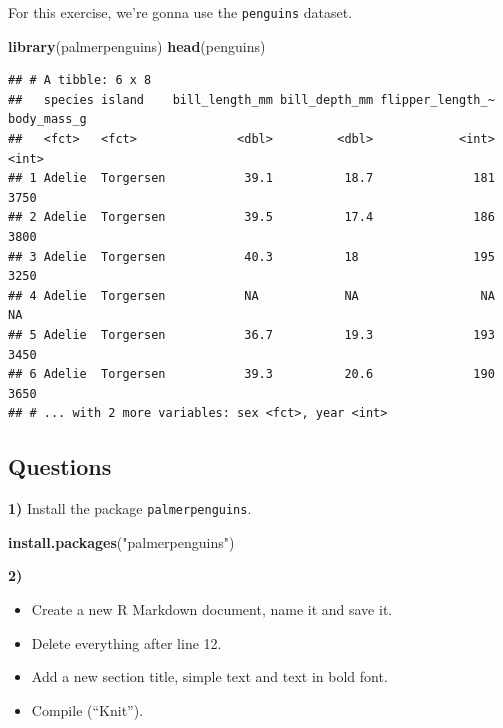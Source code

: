 \documentclass[
  12pt,
]{book}
\newenvironment{Shaded}{\begin{snugshade}}{\end{snugshade}}
\newcommand{\KeywordTok}[1]{\textcolor[rgb]{0.13,0.29,0.53}{\textbf{#1}}}
\newcommand{\NormalTok}[1]{#1}
\newcommand{\StringTok}[1]{\textcolor[rgb]{0.31,0.60,0.02}{#1}}
\providecommand{\tightlist}{%
  \setlength{\itemsep}{0pt}\setlength{\parskip}{0pt}}
\begin{document}
For this exercise, we're gonna use the \texttt{penguins} dataset.

\begin{Shaded}
\begin{Highlighting}[]
\KeywordTok{library}\NormalTok{(palmerpenguins)}
\KeywordTok{head}\NormalTok{(penguins)}
\end{Highlighting}
\end{Shaded}

\begin{verbatim}
## # A tibble: 6 x 8
##   species island    bill_length_mm bill_depth_mm flipper_length_~ body_mass_g
##   <fct>   <fct>              <dbl>         <dbl>            <int>       <int>
## 1 Adelie  Torgersen           39.1          18.7              181        3750
## 2 Adelie  Torgersen           39.5          17.4              186        3800
## 3 Adelie  Torgersen           40.3          18                195        3250
## 4 Adelie  Torgersen           NA            NA                 NA          NA
## 5 Adelie  Torgersen           36.7          19.3              193        3450
## 6 Adelie  Torgersen           39.3          20.6              190        3650
## # ... with 2 more variables: sex <fct>, year <int>
\end{verbatim}

\hypertarget{questions}{%
\subsection{Questions}\label{questions}}

\textbf{1)} Install the package \texttt{palmerpenguins}.

\begin{Shaded}
\begin{Highlighting}[]
\KeywordTok{install.packages}\NormalTok{(}\StringTok{"palmerpenguins"}\NormalTok{)}
\end{Highlighting}
\end{Shaded}

\textbf{2)}

\begin{itemize}
\tightlist
\item
  Create a new R Markdown document, name it and save it.
\item
  Delete everything after line 12.
\item
  Add a new section title, simple text and text in bold font.
\item
  Compile (``Knit'').
\end{itemize}
\end{document}
